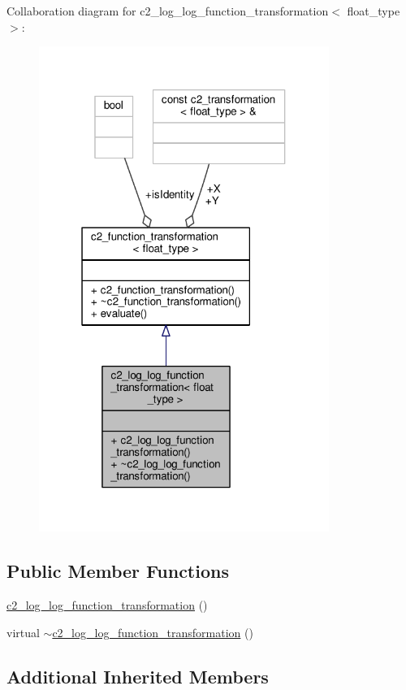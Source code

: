 Collaboration diagram for c2\+\_\+log\+\_\+log\+\_\+function\+\_\+transformation$<$ float\+\_\+type $>$\+:
\nopagebreak
\begin{figure}[H]
\begin{center}
\leavevmode
\includegraphics[width=268pt]{classc2__log__log__function__transformation__coll__graph}
\end{center}
\end{figure}
\subsection*{Public Member Functions}
\begin{DoxyCompactItemize}
\item 
\hyperlink{classc2__log__log__function__transformation_aef49184fe33cf221c7b207e2d4a7ae7a}{c2\+\_\+log\+\_\+log\+\_\+function\+\_\+transformation} ()
\item 
virtual \hyperlink{classc2__log__log__function__transformation_a613acbb92a3bbfb669075afe050fc1d1}{$\sim$c2\+\_\+log\+\_\+log\+\_\+function\+\_\+transformation} ()
\end{DoxyCompactItemize}
\subsection*{Additional Inherited Members}


